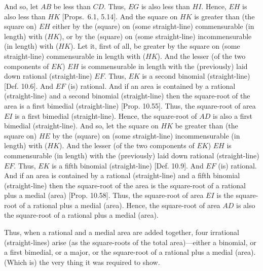 \begin{Parallel}{}{}
{ And so, let $AB$ be less than $CD$. Thus, $EG$ is also less
 than $HI$. Hence, $EH$ is also less than $HK$ [Props.~6.1, 5.14].
 And the square on $HK$ is greater than (the square on) $EH$ either
 by the (square) on (some straight-line) commensurable (in length)
 with ($HK$), or by the (square) on (some straight-line) incommensurable
 (in length) with ($HK$). Let it, first of all, be greater by the square
 on (some straight-line) commensurable in length with ($HK$).
 And the lesser (of the two components of $EK$) $EH$ is  commensurable in length with the
 (previously) laid down rational (straight-line) $EF$. Thus, $EK$
 is a second binomial (straight-line) [Def. 10.6]. 
 And $EF$ (is) rational. And if an area is contained by a rational (straight-line)
 and a second binomial (straight-line)  then the square-root of the area is a
 first bimedial (straight-line) [Prop. 10.55]. 
 Thus, the square-root of area $EI$ is a first bimedial (straight-line).
 Hence, the square-root of $AD$ is also a first bimedial (straight-line).
 And so, let the square on $HK$ be greater than (the square on) $HE$
 by the (square) on (some straight-line) incommensurable (in length) with
 ($HK$). 
 And the lesser (of the two components of $EK$) $EH$ is commensurable (in length) with the (previously) laid down rational (straight-line) $EF$.  Thus, $EK$ is a fifth binomial
 (straight-line) [Def. 10.9]. And $EF$ (is) rational. And if an area is
 contained by a rational (straight-line) and a fifth binomial (straight-line) 
 then the square-root of the area is the square-root of a rational plus
 a medial (area) [Prop. 10.58]. Thus, the square-root of area $EI$ is the square-root of a rational plus a medial (area). Hence,
 the square-root of area $AD$ is also the square-root of a rational plus
 a medial (area).
 
 Thus, when a rational and a medial area are added together, four irrational
(straight-lines) arise (as the square-roots of the
total area)---either a binomial, or a first bimedial, or a major, or the
square-root of a rational plus a medial (area). (Which is) the very thing
it was required to show.}
\end{Parallel}

